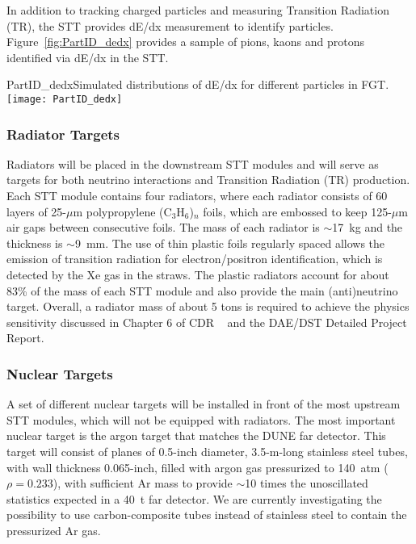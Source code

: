 In addition to tracking charged particles and measuring Transition Radiation (TR), 
the STT provides dE/dx measurement to identify particles. 
Figure~\ref{fig:PartID_dedx} provides a sample of pions, kaons and protons identified via dE/dx in the STT.
\begin{cdrfigure}
{PartID_dedx}{Simulated distributions of dE/dx for different particles in FGT.}
\texttt{[image: PartID\_dedx]}
\end{cdrfigure}

\subsubsection{Radiator Targets} 


Radiators will be placed in the downstream STT modules and will serve
as targets for both neutrino interactions and Transition Radiation
(TR) production. Each STT module contains four radiators, where each
radiator consists of 60 layers of 25-$\mu$m polypropylene
(C$_3$H$_6$)$_n$ foils, which are embossed to keep 125-$\mu$m air gaps
between consecutive foils.  The mass of each radiator is $\sim$17~kg
and the thickness is $\sim$9~mm. The use of thin plastic foils
regularly spaced allows the emission of transition radiation for
electron/positron identification, which is detected by the Xe gas in
the straws. The plastic radiators account for about 83\% of the mass of each STT module and 
also provide the main (anti)neutrino target. Overall, a radiator mass of about 5 tons 
is required to achieve the physics sensitivity discussed in 
Chapter 6 of CDR \volphys\ %
and the DAE/DST Detailed Project Report\cite{DPR}. 

\subsubsection{Nuclear Targets} 

A set of different nuclear targets will be installed in front of the
most upstream STT modules, which will not be equipped with radiators.
The most important nuclear target is the argon target that matches
the DUNE far detector.  This target will consist of planes of 0.5-inch
diameter, 3.5-m-long stainless steel tubes, with wall thickness 0.065-inch,
filled with argon gas pressurized to 140~atm ($\rho = 0.233$), with
sufficient Ar mass to provide $\sim$10 times the unoscillated
statistics expected in a 40~t far detector.  We are currently investigating the
possibility to use carbon-composite tubes instead of stainless steel to contain 
the pressurized Ar gas.

